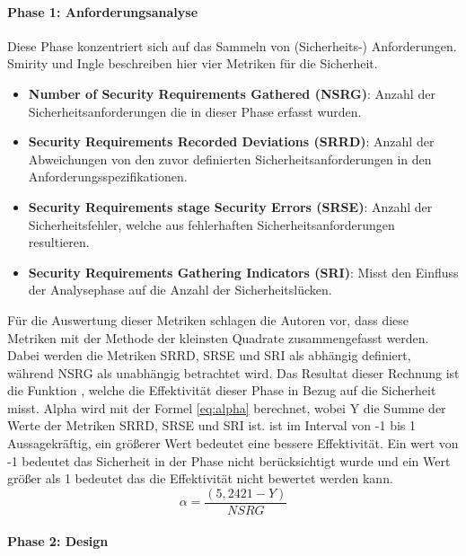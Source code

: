 \documentclass[12pt, a4paper, ngerman]{article}
\begin{document}
\paragraph{Phase 1: Anforderungsanalyse}

Diese Phase konzentriert sich auf das Sammeln von (Sicherheits-) Anforderungen.
Smirity und Ingle beschreiben hier vier Metriken für die Sicherheit.
\begin{itemize}
  \item \textbf{Number of Security Requirements Gathered (NSRG)}: Anzahl der Sicherheitsanforderungen die in dieser Phase erfasst wurden.
  \item \textbf{Security Requirements Recorded Deviations (SRRD)}: Anzahl der Abweichungen von den zuvor definierten Sicherheitsanforderungen in den Anforderungsspezifikationen.
  \item \textbf{Security Requirements stage Security Errors (SRSE)}: Anzahl der Sicherheitsfehler, welche aus fehlerhaften Sicherheitsanforderungen resultieren.
  \item \textbf{Security Requirements Gathering Indicators (SRI)}: Misst den Einfluss der Analysephase auf die Anzahl der Sicherheitslücken. 
\end{itemize}
Für die Auswertung dieser Metriken schlagen die Autoren vor, dass diese Metriken mit der Methode der kleinsten Quadrate zusammengefasst werden.
Dabei werden die Metriken SRRD, SRSE und SRI als abhängig definiert, während NSRG als unabhängig betrachtet wird.
Das Resultat dieser Rechnung ist die Funktion \alpha, welche die Effektivität dieser Phase in Bezug auf die Sicherheit misst.
Alpha wird mit der Formel \ref{eq:alpha} berechnet, wobei Y die Summe der Werte der Metriken SRRD, SRSE und SRI ist.
\alpha ist im Interval von -1 bis 1 Aussagekräftig, ein größerer Wert bedeutet eine bessere Effektivität.
Ein wert von -1 bedeutet das Sicherheit in der Phase nicht berücksichtigt wurde 
und ein Wert größer als 1 bedeutet das die Effektivität nicht bewertet werden kann.
\begin{equation} \label{eq:alpha}
  \alpha = \frac{ \left( 5,2421 - Y \right) }{ NSRG }
\end{equation}

\paragraph{Phase 2: Design}
\end{document}
